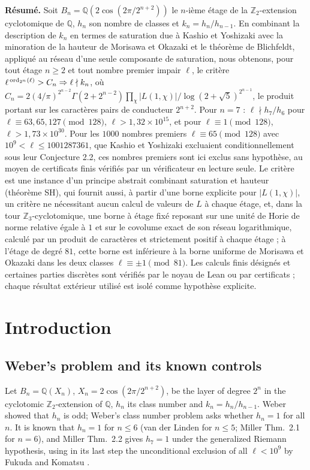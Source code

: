 \documentclass[11pt]{amsart}
\theoremstyle{remark}\newtheorem{remark}[theorem]{Remark}
\theoremstyle{definition}\newtheorem{definition}[theorem]{Definition}
\newcommand{\Q}{\mathbb{Q}}\newcommand{\Z}{\mathbb{Z}}\newcommand{\R}{\mathbb{R}}\newcommand{\F}{\mathbb{F}}
\begin{document}
{\small\noindent\textbf{R\'esum\'e.} Soit $B_n=\Q(2\cos(2\pi/2^{n+2}))$ le $n$-i\`eme \'etage de la $\Z_2$-extension cyclotomique de $\Q$, $h_n$ son nombre de classes et $k_n=h_n/h_{n-1}$. En combinant la description de $k_n$ en termes de saturation due \`a Kashio et Yoshizaki avec la minoration de la hauteur de Morisawa et Okazaki et le th\'eor\`eme de Blichfeldt, appliqu\'e au r\'eseau d'une seule composante de saturation, nous obtenons, pour tout \'etage $n\ge2$ et tout nombre premier impair $\ell$, le crit\`ere $\ell^{\,\operatorname{ord}_{2^n}(\ell)}>C_n\Rightarrow\ell\nmid k_n$, o\`u $C_n=2(4/\pi)^{2^{n-2}}\Gamma(2+2^{n-2})\prod_{\chi}|L(1,\chi)|/\log(2+\sqrt5)^{2^{n-1}}$, le produit portant sur les caract\`eres pairs de conducteur $2^{n+2}$. Pour $n=7$ : $\ell\nmid h_7/h_6$ pour $\ell\equiv63,65,127\pmod{128}$, $\ell>1{,}32\times10^{15}$, et pour $\ell\equiv1\pmod{128}$, $\ell>1{,}73\times10^{30}$. Pour les $1000$ nombres premiers $\ell\equiv65\pmod{128}$ avec $10^9<\ell\le1001287361$, que Kashio et Yoshizaki excluaient conditionnellement sous leur Conjecture 2.2, ces nombres premiers sont ici exclus sans hypoth\`ese, au moyen de certificats finis v\'erifi\'es par un v\'erificateur en lecture seule. Le crit\`ere est une instance d'un principe abstrait combinant saturation et hauteur (th\'eor\`eme SH), qui fournit aussi, \`a partir d'une borne explicite pour $|L(1,\chi)|$, un crit\`ere ne n\'ecessitant aucun calcul de valeurs de $L$ \`a chaque \'etage, et, dans la tour $\Z_3$-cyclotomique, une borne \`a \'etage fix\'e reposant sur une unit\'e de Horie de norme relative \'egale \`a $1$ et sur le covolume exact de son r\'eseau logarithmique, calcul\'e par un produit de caract\`eres et strictement positif \`a chaque \'etage ; \`a l'\'etage de degr\'e $81$, cette borne est inf\'erieure \`a la borne uniforme de Morisawa et Okazaki dans les deux classes $\ell\equiv\pm1\pmod{81}$. Les calculs finis d\'esign\'es et certaines parties discr\`etes sont v\'erifi\'es par le noyau de Lean ou par certificats ; chaque r\'esultat ext\'erieur utilis\'e est isol\'e comme hypoth\`ese explicite.\par}\bigskip
\tableofcontents

\section{Introduction}
\subsection{Weber's problem and its known controls}
Let $B_n=\Q(X_n)$, $X_n=2\cos(2\pi/2^{n+2})$, be the layer of degree $2^n$ in the cyclotomic $\Z_2$-extension of $\Q$, $h_n$ its class number and $k_n=h_n/h_{n-1}$. Weber showed that $h_n$ is odd; Weber's class number problem asks whether $h_n=1$ for all $n$. It is known that $h_n=1$ for $n\le6$ (van der Linden for $n\le5$; Miller \cite{Mi} Thm.~2.1 for $n=6$), and Miller \cite{Mi} Thm.~2.2 gives $h_7=1$ under the generalized Riemann hypothesis, using in its last step the unconditional exclusion of all $\ell<10^9$ by Fukuda and Komatsu \cite{FK3}.
\end{document}
